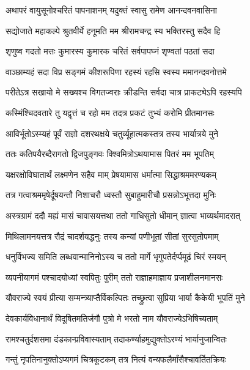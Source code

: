 

\twolineshloka
{अथापरं वायुसूनोश्चरितं पापनाशनम्}
{यदुक्तं स्वासु रामेण आनन्दवनवासिना}%

\twolineshloka
{सद्योजाते महाकल्पे श्रुतवीर्ये हनूमति}
{मम श्रीरामचन्द्र स्य भक्तिरस्तु सदैव हि}%

\twolineshloka
{शृणुष्व गदतो मत्तः कुमारस्य कुमारक}
{चरितं सर्वपापघ्नं शृण्वतां पठतां सदा}%

\twolineshloka
{वाञ्छाम्यहं सदा विप्र सङ्गमं कीशरूपिणा}
{रहस्यं रहसि स्वस्य ममानन्दवनोत्तमे}%

\twolineshloka
{परीतेऽत्र सखायो मे सख्यश्च विगतज्वराः}
{क्रीडन्ति सर्वदा चात्र प्राकट्येऽपि रहस्यपि}%

\twolineshloka
{कस्मिंश्चिदवतारे तु यद्वृत्तं च रहो मम}
{तदत्र प्रकटं तुभ्यं करोमि प्रीतमानसः}%

\twolineshloka
{आविर्भूतोऽस्म्यहं पूर्वं राज्ञो दशरथक्षये}
{चतुर्व्यूहात्मकस्तत्र तस्य भार्यात्रये मुने}%

\twolineshloka
{ततः कतिपयैरब्दैरागतो द्विजपुङ्गवः}
{क्श्विमित्रोऽथयामास पितरं मम भूपतिम्}%

\twolineshloka
{यक्षरक्षोविघातार्थं लक्ष्मणेन सहैव माम्}
{प्रेषयामास धर्मात्मा सिद्धाश्रममरण्यकम्}%

\twolineshloka
{तत्र गत्वाश्रममृषेर्दूषयन्तौ निशाचरौ}
{ध्वस्तौ सुबाहुमारीचौ प्रसन्नोऽभूत्तदा मुनिः}%

\twolineshloka
{अस्त्रग्रामं ददौ मह्यं मासं चावासयत्तथा}
{ततो गाधिसुतो धीमान् ज्ञात्वा भाव्यर्थमादरात्}%

\twolineshloka
{मिथिलामनयत्तत्र रौद्रं चादर्शयद्धनुः}
{तस्य कन्यां पणीभूतां सीतां सुरसुतोपमाम्}%

\twolineshloka
{धनुर्विभज्य समिति लब्धवान्मानिनोऽस्य च}
{ततो मार्गे भृगुपतेर्दर्प्पमूढं चिरं स्मयन्}%

\twolineshloka
{व्यपनीयागमं पश्चादयोध्यां स्वपितुः पुरीम्}
{ततो राज्ञाहमाज्ञाय प्रजाशीलनमानसः}%

\twolineshloka
{यौवराज्ये स्वयं प्रीत्या सम्मन्त्र्याप्तैर्विकल्पितः}
{तच्छ्रुत्वा सुप्रिया भार्या कैकेयी भूपतिं मुने}%

\twolineshloka
{देवकार्यविधानार्थं विदूषितमतिर्जगौ}
{पुत्रो मे भरतो नाम यौवराज्येऽभिषिच्यताम्}%

\twolineshloka
{रामश्चतुर्दशसमा दंडकान्प्रविवास्यताम्}
{तदाकर्ण्याहमुद्युक्तोऽरण्यं भार्यानुजान्वितः}%

\twolineshloka
{गन्तुं नृपतिनानुक्तोऽप्यगमं चित्रकूटकम्}
{तत्र नित्यं वन्यफलैर्मांसैश्चावर्तितक्रियः}%

